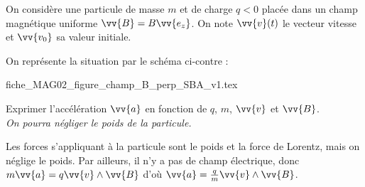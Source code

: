 \debutEntrainement


                                \initialisationPartieGauche %
On considère une particule de masse $m$ et de charge $q<0$ placée dans un champ magnétique uniforme $\vv{B}=B\vv{e_z}$. On note $\vv{v}(t)$ le vecteur vitesse et $\vv{v_0}$ sa valeur initiale.

\smallskip

On représente la situation par le schéma ci-contre :
                                \initialisationPartieDroite %
\begin{center}
{fiche_MAG02_figure_champ_B_perp_SBA_v1.tex}
\end{center}
                               \finalisationDuPartageDePage %



\begin{enonce}
Exprimer l'accélération $\vv{a}$ en fonction de $q$, $m$, $\vv{v}$ et $\vv{B}$.\minusMedskip\\
{\itshape On pourra négliger le poids de la particule.}
\end{enonce}


\begin{corrige}
Les forces s'appliquant à la particule sont le poids et la force de Lorentz, mais on néglige le poids. Par ailleurs, il n'y a pas de champ électrique, donc $m\vv{a}=q\vv{v}\wedge \vv{B}$ d'où $\vv{a}=\frac{q}{m}\vv{v}\wedge \vv{B}$.
\end{corrige}

